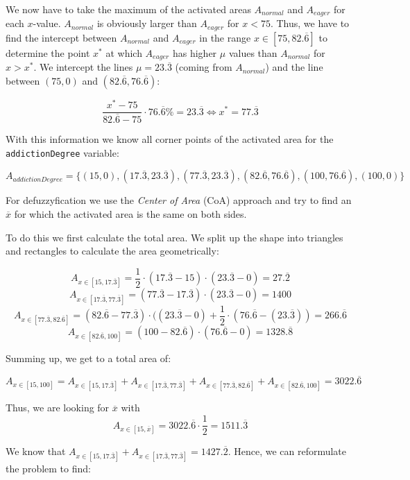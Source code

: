 We now have to take the maximum of the activated areas $A_{normal}$ and $A_{eager}$ for each $x$-value. $A_{normal}$ is obviously larger than $A_{eager}$ for $ x < 75 $. Thus, we have to find the intercept between  $A_{normal}$ and $A_{eager}$ in the range $ x \in [75, 82.\overline{6}]$ to determine the point $x^*$ at which $A_{eager}$ has higher $\mu$ values than $A_{normal}$ for $x > x^*$. We intercept the lines $\mu = 23.\overline{3}$ (coming from $A_{normal}$) and the line between $(75,0)$ and  $(82.\overline{6},76.\overline{6})$:

\[ \frac{x^*-75}{82.\overline{6}-75} \cdot 76.\overline{6}\% = 23.\overline{3} \Leftrightarrow x^* = 77.\overline{3} \]

With this information we know all corner points of the activated area for the \texttt{addictionDegree} variable:

\[ A_{addictionDegree} = \{ (15,0),(17.\overline{3},23.\overline{3}), (77.\overline{3},23.\overline{3}), (82.\overline{6},76.\overline{6}), (100,76.\overline{6}), (100,0)  \}\]

For defuzzyfication we use the \textit{Center of Area} (CoA) approach and try to find an $\overline{x}$ for which the activated area is the same on both sides.

To do this we first calculate the total area. We split up the shape into triangles and rectangles to calculate the area geometrically:

\[ A_{x \in [15,17.\overline{3}]} = \frac{1}{2} \cdot (17.\overline{3} - 15) \cdot (23.\overline{3} - 0 ) = 27.\overline{2} \]
\[ A_{x \in [17.\overline{3},77.\overline{3}]} = (77.\overline{3} - 17.\overline{3}) \cdot  (23.\overline{3} - 0 ) = 1400 \]
\[ A_{x \in [77.\overline{3},82.\overline{6}]} = (82.\overline{6} - 77.\overline{3}) \cdot ((23.\overline{3} - 0) + \frac{1}{2} \cdot (76.\overline{6} - (23.\overline{3})) = 266.\overline{6} \]
\[ A_{x \in [82.\overline{6},100]} = (100-82.\overline{6}) \cdot (76.\overline{6}-0) = 1328.\overline{8} \]

Summing up, we get to a total area of:

\[ A_{x \in [15,100]} = A_{x \in [15,17.\overline{3}]} + A_{x \in [17.\overline{3},77.\overline{3}]} + A_{x \in [77.\overline{3},82.\overline{6}]} + A_{x \in [82.\overline{6},100]} = 3022.\overline{6} \]

Thus, we are looking for $\overline{x}$ with 
\[ A_{x \in [15,\overline{x}]} = 3022.\overline{6} \cdot \frac{1}{2} = 1511.\overline{3} \]

We know that $A_{x \in [15,17.\overline{3}]} + A_{x \in [17.\overline{3},77.\overline{3}]} = 1427.\overline{2} $. Hence, we can reformulate the problem to find:

